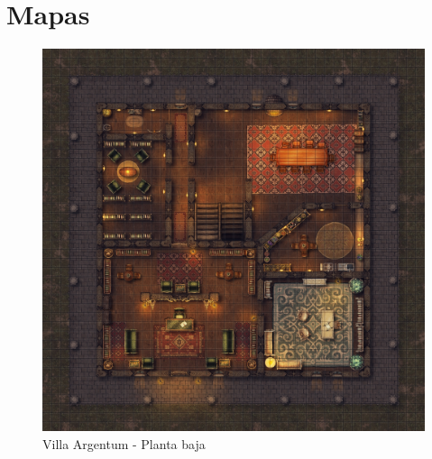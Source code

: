 \documentclass[10pt,twoside,twocolumn,openany]{dndbook}
\begin{document}




\section{Mapas}

\begin{figure}[hb!]
  \centering
  \includegraphics[width=\textwidth]{maps/villa-argentum-pb.jpg}
  \caption{Villa Argentum - Planta baja}
  \label{fig:vapbfull}
\end{figure}
\end{document}
